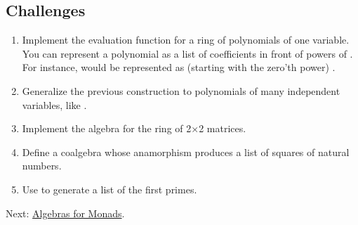\subsection{Challenges}\label{challenges}

\begin{enumerate}
\tightlist
\item
  Implement the evaluation function for a ring of polynomials of one
  variable. You can represent a polynomial as a list of coefficients in
  front of powers of . For instance,  would be
  represented as (starting with the zero'th power)
  \code{{[}-1,\ 0,\ 4{]}}.
\item
  Generalize the previous construction to polynomials of many
  independent variables, like .
\item
  Implement the algebra for the ring of 2×2 matrices.
\item
  Define a coalgebra whose anamorphism produces a list of squares of
  natural numbers.
\item
  Use  to generate a list of the first 
  primes.
\end{enumerate}

Next:
\href{https://bartoszmilewski.com/2017/03/14/algebras-for-monads/}{Algebras
for Monads}.
